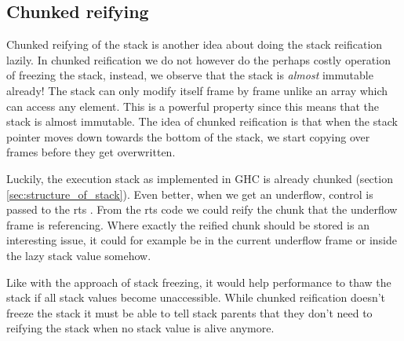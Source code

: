 \subsection{Chunked reifying}

Chunked reifying of the stack is another idea about doing the stack
reification lazily. In chunked reification we do not however do the
perhaps costly operation of freezing the stack, instead, we observe
that the stack is \emph{almost} immutable already! The stack can only
modify itself frame by frame unlike an array which can access any
element. This is a powerful property since this means that the stack is
almost immutable. The idea of chunked reification is that when the stack
pointer moves down towards the bottom of the stack, we start
copying over frames before they get overwritten. 

Luckily, the execution stack as implemented in GHC is already chunked
(section \ref{sec:structure_of_stack}). Even better, when we get an
underflow, control is passed to the rts \cite{github_underflow_frame}.
From the rts code we could reify the chunk that the underflow frame is
referencing. Where exactly the reified chunk should be stored is an
interesting issue, it could for example be in the current underflow
frame or inside the lazy stack value somehow.

Like with the approach of stack freezing, it would help performance
to thaw the stack if all stack values become unaccessible. While chunked
reification doesn't freeze the stack it must be able to tell stack
parents that they don't need to reifying the stack when no stack value
is alive anymore.
